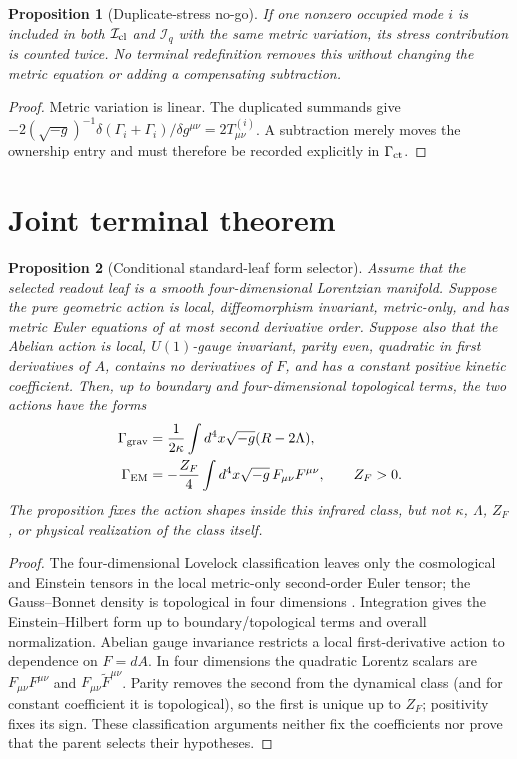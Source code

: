 \documentclass[11pt]{article}
\newtheorem{proposition}{Proposition}
\begin{document}
\begin{proposition}[Duplicate-stress no-go]
If one nonzero occupied mode $i$ is included in both $\mathcal I_{\rm cl}$ and
$\mathcal I_q$ with the same metric variation, its stress contribution is
counted twice. No terminal redefinition removes this without changing the
metric equation or adding a compensating subtraction.
\end{proposition}
\begin{proof}
Metric variation is linear. The duplicated summands give
$-2(\sqrt{-g})^{-1}\delta(\Gamma_i+\Gamma_i)/\delta g^{\mu\nu}
=2T^{(i)}_{\mu\nu}$. A subtraction merely moves the ownership entry and must
therefore be recorded explicitly in $\Gamma_{\rm ct}$.
\end{proof}

\section{Joint terminal theorem}

\begin{proposition}[Conditional standard-leaf form selector]
\label{prop:standardforms}
Assume that the selected readout leaf is a smooth four-dimensional Lorentzian
manifold.  Suppose the pure geometric action is local, diffeomorphism
invariant, metric-only, and has metric Euler equations of at most second
derivative order.  Suppose also that the Abelian action is local,
$U(1)$-gauge invariant, parity even, quadratic in first derivatives of $A$,
contains no derivatives of $F$, and has a constant positive kinetic
coefficient.  Then, up to boundary and four-dimensional topological terms,
the two actions have the forms
\begin{align}
\Gamma_{\rm grav}&={1\over2\kappa}\int d^4x\sqrt{-g}(R-2\Lambda),\\
\Gamma_{\rm EM}&=-{Z_F\over4}\int d^4x\sqrt{-g}\,F_{\mu\nu}F^{\mu\nu},
\qquad Z_F>0.
\end{align}
The proposition fixes the action shapes inside this infrared class, but not
$\kappa$, $\Lambda$, $Z_F$, or physical realization of the class itself.
\end{proposition}
\begin{proof}
The four-dimensional Lovelock classification leaves only the cosmological and
Einstein tensors in the local metric-only second-order Euler tensor; the
Gauss--Bonnet density is topological in four dimensions
\citep{Lovelock1971}.  Integration gives the Einstein--Hilbert form up to
boundary/topological terms and overall normalization.  Abelian gauge
invariance restricts a local first-derivative action to dependence on
$F=dA$.  In four dimensions the quadratic Lorentz scalars are
$F_{\mu\nu}F^{\mu\nu}$ and
$F_{\mu\nu}\widetilde F^{\mu\nu}$.  Parity removes the second from the
dynamical class (and for constant coefficient it is topological), so the
first is unique up to $Z_F$; positivity fixes its sign.  These classification
arguments neither fix the coefficients nor prove that the parent selects
their hypotheses.
\end{proof}
\end{document}
